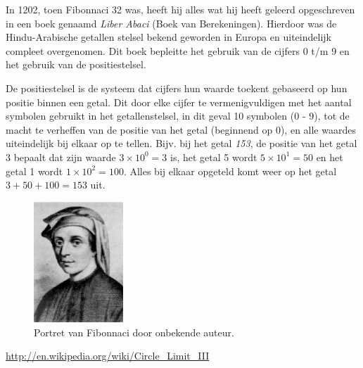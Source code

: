 \documentclass{article}
\begin{document}
 In 1202, toen Fibonnaci 32 was, heeft hij alles wat hij heeft geleerd opgeschreven in een boek genaamd \textit{Liber Abaci} (Boek van Berekeningen). Hierdoor was de Hindu-Arabische getallen stelsel bekend geworden in Europa en uiteindelijk compleet overgenomen. Dit boek bepleitte het gebruik van de cijfers 0 t/m 9 en het gebruik van de positiestelsel. 

De positiestelsel is de systeem dat cijfers hun waarde toekent gebaseerd op hun positie binnen een getal. Dit door elke cijfer te vermenigvuldigen met het aantal symbolen gebruikt in het getallenstelsel, in dit geval 10 symbolen (0 - 9), tot de macht te verheffen van de positie van het getal (beginnend op 0), en alle waardes uiteindelijk bij elkaar op te tellen. Bijv. bij het getal \textit{153}, de positie van het getal 3 bepaalt dat zijn waarde \(3 \times 10^0 = 3\) is, het getal 5 wordt \(5 \times 10^1 = 50\) en het getal 1 wordt \(1 \times 10^2 = 100\). Alles bij elkaar opgeteld komt weer op het getal \(3 + 50 + 100 = 153\) uit.

\begin{figure}[Hh]
	\centering
	\includegraphics[width=0.3\textwidth]{Fibonacci.jpg}
	\caption{Portret van Fibonnaci door onbekende auteur.}
\end{figure}





\pagebreak

\begin{thebibliography}{9}

\bibitem{}
	\url{http://en.wikipedia.org/wiki/Circle_Limit_III}
	
\end{thebibliography}
\end{document}
